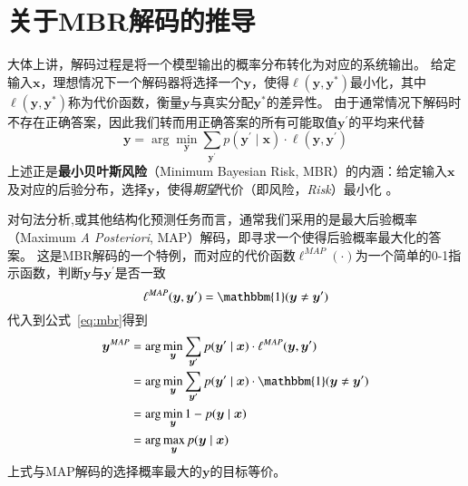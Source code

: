 \chapter{关于MBR解码的推导}
\label{cha:mbr-decoding}
大体上讲，解码过程是将一个模型输出的概率分布转化为对应的系统输出。
给定输入$\boldsymbol{x}$，理想情况下一个解码器将选择一个$\boldsymbol{y}$，使得$\ell(\boldsymbol{y},\boldsymbol{y}^{\ast})$最小化，其中$\ell(\boldsymbol{y},\boldsymbol{y}^{\ast})$称为代价函数，衡量$\boldsymbol{y}$与真实分配$\boldsymbol{y}^{\ast}$的差异性。
由于通常情况下解码时不存在正确答案，因此我们转而用正确答案的所有可能取值$\boldsymbol{y}^{\prime}$的平均来代替
\begin{equation}
	\label{eq:mbr}
	\boldsymbol{y}= \arg\min_{\boldsymbol{y}}\sum_{\boldsymbol{y}^{\prime}}p(\boldsymbol{y}^{\prime}\mid\boldsymbol{x})\cdot\ell(\boldsymbol{y},\boldsymbol{y}^{\prime})
\end{equation}
上述正是\textbf{最小贝叶斯风险}（Minimum Bayesian Risk, MBR）的内涵：给定输入$\boldsymbol{x}$及对应的后验分布，选择$\boldsymbol{y}$，使得\textit{期望}代价（即风险，\textit{Risk}）最小化 \citep{stoyanov-eisner-2012-minimum}。

对句法分析,或其他结构化预测任务而言，通常我们采用的是最大后验概率（Maximum \textit{A Posteriori}, MAP）解码，即寻求一个使得后验概率最大化的答案。
这是MBR解码的一个特例，而对应的代价函数$\ell^{MAP}(\cdot)$为一个简单的0-1指示函数，判断$\boldsymbol{y}$与$\boldsymbol{y}^{\prime}$是否一致
\begin{equation}
	\ell^{MAP}(\boldsymbol{y},\boldsymbol{y}^{\prime}) = \mathbbm{1}(\boldsymbol{y}\neq\boldsymbol{y}^{\prime})
\end{equation}
代入到公式~\ref{eq:mbr}得到
\begin{equation}
	\label{eq:map}
	\begin{split}
		\boldsymbol{y}^{MAP}&= \arg\min_{\boldsymbol{y}}\sum_{\boldsymbol{y}^{\prime}}p(\boldsymbol{y}^{\prime}\mid\boldsymbol{x})\cdot\ell^{MAP}(\boldsymbol{y},\boldsymbol{y}^{\prime})\\
		&=\arg\min_{\boldsymbol{y}}\sum_{\boldsymbol{y}^{\prime}}p(\boldsymbol{y}^{\prime}\mid\boldsymbol{x})\cdot\mathbbm{1}(\boldsymbol{y}\neq\boldsymbol{y}^{\prime})\\
		&=\arg\min_{\boldsymbol{y}} 1-p(\boldsymbol{y}\mid\boldsymbol{x})\\
		&=\arg\max_{\boldsymbol{y}}p(\boldsymbol{y}\mid\boldsymbol{x})
	\end{split}
\end{equation}
上式与MAP解码的选择概率最大的$\boldsymbol{y}$的目标等价。

